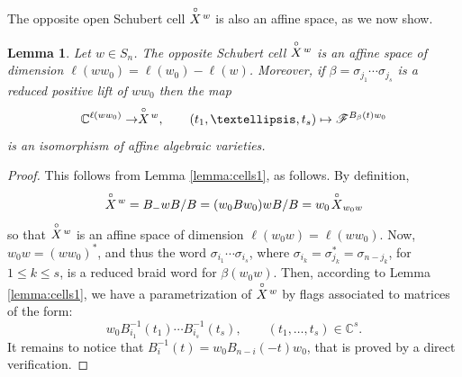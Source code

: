 \documentclass[10pt]{amsart}
\theoremstyle{plain}
\newtheorem{lemma}[thm]{Lemma}
\theoremstyle{definition}
\theoremstyle{remark}
\numberwithin{equation}{section}
\newcommand{\C}{\mathbb{C}}
\newcommand{\sse}{\subseteq}
\newcommand{\lr}{\longrightarrow}
\newcommand{\bC}{\mathbb{C}}
\renewcommand{\C}{\mathbb{C}}
\newcommand{\cF}{\mathscr{F}}
\newcommand{\schub}{\buildrel\circ \over X}
\DeclareMathOperator{\id}{id}
\DeclareMathOperator{\inv}{inv}
\newcommand{\MG}[1]{{\color{teal}{{\bf Misha}: #1}}}
\begin{document}
	

\noindent The opposite open Schubert cell $\schub\!^{w}$ is also an affine space, as we now show.

\begin{lemma}\label{lemma:cells2}
Let $w \in S_n$. The opposite Schubert cell $\schub\!^{w}$ is an affine space of dimension $\ell(ww_0) = \ell(w_0) - \ell(w)$. Moreover, if $\beta = \sigma_{j_1}\cdots \sigma_{j_s}$ is a reduced positive lift of $ww_0$ then the map
\[
\C^{\ell(ww_0)} \to \schub\!^{w}, \qquad (t_1, \dots, t_s) \mapsto \cF^{B_{\beta}(t)w_0}
\]
is an isomorphism of affine algebraic varieties.
\end{lemma}
\begin{proof}
This follows from Lemma \ref{lemma:cells1}, as follows. By definition,
\[
\schub\!^{w} = B_{-}wB/B = (w_{0}Bw_{0})wB/B = w_0\!\schub_{w_0w}
\]
so that $\schub\!^{w}$ is an affine space of dimension $\ell(w_0w) = \ell(ww_0)$. Now, $w_0w = (ww_0)^*$, and thus the word $\sigma_{i_1}\cdots\sigma_{i_s}$, where 
$\sigma_{i_k} = \sigma_{j_k}^* = \sigma_{n - j_k}$, for $1 \leq k \leq s$, is a reduced braid word for $\beta(w_0w)$.
Then, according to Lemma \ref{lemma:cells1}, we have a parametrization of $\schub\!^{w}$ by flags associated to matrices of the form:
\[
w_0B_{i_1}^{-1}(t_1)\cdots B_{i_s}^{-1}(t_s), \qquad (t_1, \dots, t_s) \in \C^{s}.
\]
It remains to notice that $B_{i}^{-1}(t) = w_0B_{n-i}(-t)w_0$, that 
is proved by a direct verification.
\end{proof}
\end{document}
